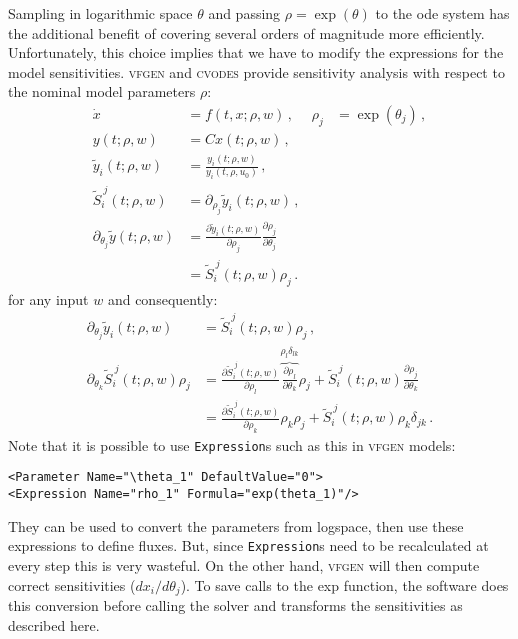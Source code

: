 \documentclass[utf8,english]{scrartcl}
\begin{document}
Sampling in logarithmic space $\theta$ and passing $\rho=\exp(\theta)$
to the ode system has the additional benefit of covering several
orders of magnitude more efficiently. Unfortunately, this choice
implies that we have to modify the expressions for the model
sensitivities. \textsc{vfgen} and \textsc{cvodes} provide
sensitivity analysis with respect to the nominal model parameters
$\rho$:
\begin{align}
  \dot x&=f(t,x;\rho,w)\,,& \rho_j&=\exp(\theta_j)\,,\nonumber\\
  y(t;\rho,w)&=C x(t;\rho,w)\,,\nonumber\\
  \tilde y_i(t;\rho,w)&=\frac{y_i(t;\rho,w)}{y_i(t,\rho,u_0)}\,,\label{eq:ode_rho}\\
  \tilde S_i^{~j}(t;\rho,w)&=\partial_{\rho_j} \tilde y_i(t;\rho,w)\,,\nonumber\\
  \partial_{\theta_j}\tilde y(t;\rho,w)&=\frac{\partial\tilde y_i(t;\rho,w)}{\partial\rho_j}\frac{\partial \rho_j}{\partial\theta_j}\nonumber\\
  &=\tilde S_i^{~j}(t;\rho,w)\rho_j\,.\nonumber
\end{align}
for any input $w$ and consequently:
\begin{align}
  \partial_{\theta_j}\tilde y_i(t;\rho,w)&=\tilde S_i^{~j}(t;\rho,w)\rho_j\,,\nonumber\\
  \partial_{\theta_k}\tilde S_i^{~j}(t;\rho,w)\rho_j&=\frac{\partial
    \tilde
    S_i^{~j}(t;\rho,w)}{\partial\rho_l}\overbrace{\frac{\partial\rho_l}{\partial\theta_k}}^{\rho_l\delta_{lk}}\rho_j
  + \tilde
  S_i^{~j}(t;\rho,w)\frac{\partial\rho_j}{\partial\theta_k}\label{eq:dfyS_rho}\\
  &=\frac{\partial \tilde
    S_i^{~j}(t;\rho,w)}{\partial\rho_k}\rho_k\rho_j + \tilde
  S_i^{~j}(t;\rho,w)\rho_k\delta_{jk}\,.\nonumber
\end{align}
Note that it is possible to use \texttt{Expression}s such as this in
\textsc{vfgen} models:
\begin{center}
\begin{verbatim}
<Parameter Name="\theta_1" DefaultValue="0">
<Expression Name="rho_1" Formula="exp(theta_1)"/>
\end{verbatim}
\end{center}
They can be used to convert the parameters from logspace, then use
these expressions to define fluxes. But, since \texttt{Expression}s
need to be recalculated at every step this is very wasteful. On the
other hand, \textsc{vfgen} will then compute correct sensitivities
($dx_i/d\theta_j$). To save calls to the exp function, the software
does this conversion before calling the solver and transforms the
sensitivities as described here.
\end{document}
